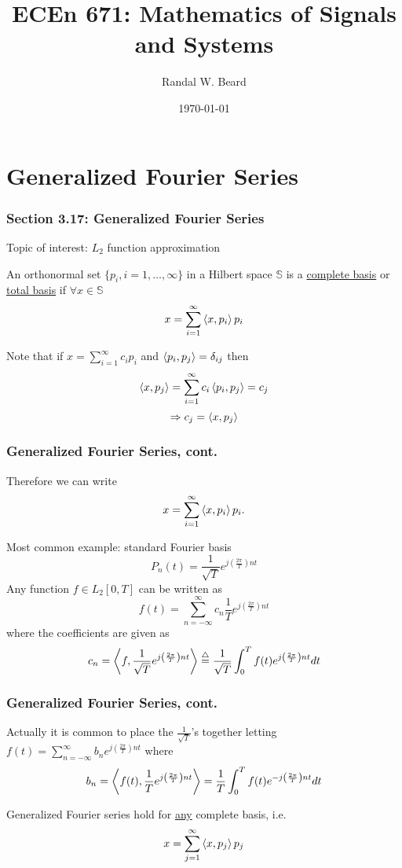 \documentclass{beamer}
\title{ECEn 671: Mathematics of Signals and Systems}
\author{Randal W. Beard}
\institute{Brigham Young University}
\date{\today}
\begin{document}
\begin{frame}
	\titlepage
\end{frame}


\section{Generalized Fourier Series}
\frame{\sectionpage}

\begin{frame}\frametitle{Section 3.17: Generalized Fourier Series}

	Topic of interest: $L_2$ function approximation
	
	\vfill

	\begin{definition}
	An orthonormal set $\{p_i, i=1, \ldots, \infty\}$ in a Hilbert space
	$\mathbb{S}$ is a \underline{complete basis} or \underline{total basis} if
	$\forall x \in \mathbb{S}$
	\[ x = \sum_{i=1}^{\infty} \left<x,p_i \right>p_i \]
	\end{definition}
	
	\vfill

	Note that if $x = \sum_{i=1}^{\infty} c_ip_i$ and $\left<p_i,p_j \right> =
	\delta_{ij}$ then
	\[ \left<x,p_j \right> = \sum_{i=1}^{\infty}c_i\left<p_i,p_j \right>=c_j\]
	\[ \Rightarrow c_j = \left<x,p_j \right> \]

	
\end{frame}

\begin{frame}\frametitle{Generalized Fourier Series, cont.}
	Therefore we can write
	\[ 
	x = \sum_{i=1}^{\infty} \left<x,p_i \right>p_i.
	\]	
	
	\vfill
	
	Most common example:  standard Fourier basis
	\[ P_n(t) = \frac{1}{\sqrt{T}}e^{j \left(\frac{2\pi}{T}\right)n t} \]
	Any function $f \in L_2[0,T]$ can be written as
	\[ f(t) = \sum_{n=-\infty}^{\infty}c_n \frac{1}{T}
	e^{j\left(\frac{2\pi}{T}\right)nt} \]
	where the coefficients are given as
	\[ c_n = \left<f,\frac{1}{\sqrt{T}}e^{j\left(\frac{2\pi}{T}\right)nt} \right> \stackrel{\triangle}{=}
	\frac{1}{\sqrt{T}}\int_{0}^{T}f(t)e^{j\left(\frac{2\pi}{T}\right)nt}dt \]

\end{frame}

\begin{frame}\frametitle{Generalized Fourier Series, cont.}
	Actually it is common to place the $\frac{1}{\sqrt{T}}$'s together
	letting $f(t) = \sum_{n=-\infty}^{\infty} b_n e^{j\left(\frac{2\pi}{T}\right)nt}$ where
	\[ b_n = \left<f(t), \frac{1}{T}e^{j\left(\frac{2\pi}{T}\right)nt} \right> =
	\frac{1}{T}\int_0^{T}f(t) e^{-j\left(\frac{2\pi}{T}\right)nt}dt \]
	
	Generalized Fourier series hold for \underline{any} complete basis,
	i.e.
	\[ x = \sum_{j=1}^{\infty} \left<x,p_j \right>p_j \]
	
\end{frame}
\end{document}
